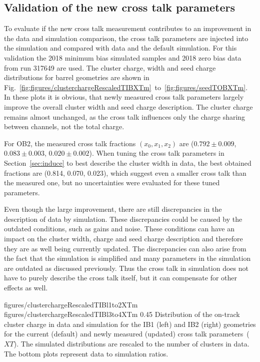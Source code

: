 \subsection{Validation of the new cross talk parameters~\label{sec:validation}}

To evaluate if the new cross talk measurement contributes to an improvement in the data and simulation comparison,  the cross talk parameters are injected into the simulation and compared with data and the default simulation. For this validation the 2018 minimum bias simulated samples and 2018 zero bias data from run 317649 are used. The cluster charge, width and seed charge distributions for barrel geometries are shown in Fig.~\ref{fig:figures/clusterchargeRescaledTIBXTm}~to~\ref{fig:figures/seedTOBXTm}. In these plots it is obvious, that newly measured cross talk parameters largely improve the overall cluster width and seed charge description. The cluster charge remains almost unchanged, as the cross talk influences only the charge sharing between channels, not the total charge.  

For OB2, the measured cross talk fractions $(x_{0}, x_{1}, x_{2})$ are ($0.792 \pm 0.009 $, $0.083 \pm 0.003 $, $0.020 \pm 0.002$). When tuning the cross talk parameters in Section~\ref{sec:induce} to best describe the cluster width in data, the best obtained fractions are (0.814, 0.070, 0.023), which suggest even a smaller cross talk than the measured one, but no uncertainties were evaluated for these tuned parameters. 

Even though the large improvement, there are still discrepancies in the description of data by simulation. These discrepancies could be caused by the outdated conditions, such as gains and noise. These conditions can have an impact on the cluster width, charge and seed charge description and therefore they are as well being currently updated. The discrepancies can also arise from the fact that the simulation is simplified and many parameters in the simulation are outdated as discussed previously. Thus the cross talk in simulation does not have to purely describe the cross talk itself, but it can compensate for other effects as well. 


                 {figures/clusterchargeRescaledTIBl1to2XTm} %
                 {figures/clusterchargeRescaledTIBl3to4XTm} %
                 {0.45}       %
                 { Distribution of the on-track cluster charge in data and simulation for the IB1 (left) and IB2 (right) geometries for the current (default) and newly measured (updated) cross talk parameters~($XT$).  The simulated distributions are rescaled to the number of clusters in data.  The bottom plots represent data to simulation ratios. }

